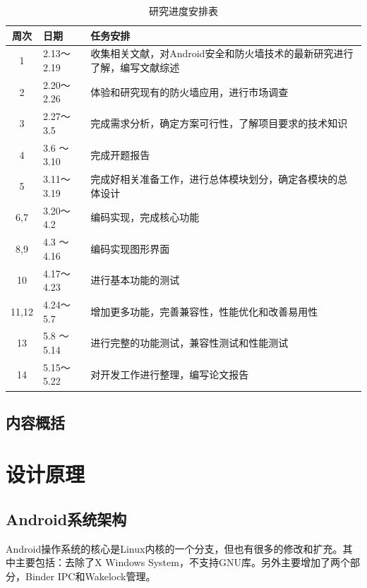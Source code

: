 \documentclass[format=final, language=chinese, degree=bachelor]{hustthesis}
\begin{document}
\begin{table}[h!]
\centering
\caption{研究进度安排表}
	\begin{tabular}{|c|l|l|}\hline
	周次 	& 日期 & 任务安排\\\hline
	1		& 2.13～2.19 & 收集相关文献，对Android安全和防火墙技术的最新研究进行了解，编写文献综述\\\hline
	2		& 2.20～2.26 & 体验和研究现有的防火墙应用，进行市场调查\\\hline
	3		& 2.27～3.5  & 完成需求分析，确定方案可行性，了解项目要求的技术知识\\\hline
	4		& 3.6 ～3.10 & 完成开题报告\\\hline
	5		& 3.11～3.19 & 完成好相关准备工作，进行总体模块划分，确定各模块的总体设计\\\hline
	6,7		& 3.20～4.2  & 编码实现，完成核心功能\\\hline
	8,9 	& 4.3 ～4.16 & 编码实现图形界面\\\hline
	10		& 4.17～4.23 & 进行基本功能的测试\\\hline
	11,12	& 4.24～5.7  & 增加更多功能，完善兼容性，性能优化和改善易用性\\\hline
	13 		& 5.8 ～5.14 & 进行完整的功能测试，兼容性测试和性能测试\\\hline
	14 		& 5.15～5.22 & 对开发工作进行整理，编写论文报告\\\hline
	\end{tabular}	
\end{table}


\section{内容概括}


\chapter{设计原理}\label{chapter:3}

\section{Android系统架构}

Android操作系统的核心是Linux内核的一个分支，但也有很多的修改和扩充。其中主要包括：去除了X Windows System，不支持GNU库。另外主要增加了两个部分，Binder IPC和Wakelock管理。
\end{document}
